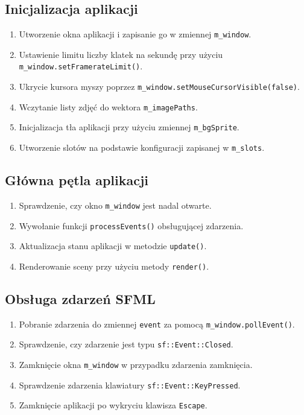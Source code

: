 \documentclass[12pt]{article}
\begin{document}
\subsection{Inicjalizacja aplikacji}
\begin{enumerate}
    \item Utworzenie okna aplikacji i zapisanie go w zmiennej \texttt{m\_window}.
    \item Ustawienie limitu liczby klatek na sekundę przy użyciu \texttt{m\_window.setFramerateLimit()}.
    \item Ukrycie kursora myszy poprzez \texttt{m\_window.setMouseCursorVisible(false)}.
    \item Wczytanie listy zdjęć do wektora \texttt{m\_imagePaths}.
    \item Inicjalizacja tła aplikacji przy użyciu zmiennej \texttt{m\_bgSprite}.
    \item Utworzenie slotów na podstawie konfiguracji zapisanej w \texttt{m\_slots}.
\end{enumerate}

\subsection{Główna pętla aplikacji}
\begin{enumerate}
    \item Sprawdzenie, czy okno \texttt{m\_window} jest nadal otwarte.
    \item Wywołanie funkcji \texttt{processEvents()} obsługującej zdarzenia.
    \item Aktualizacja stanu aplikacji w metodzie \texttt{update()}.
    \item Renderowanie sceny przy użyciu metody \texttt{render()}.
\end{enumerate}

\subsection{Obsługa zdarzeń SFML}
\begin{enumerate}
    \item Pobranie zdarzenia do zmiennej \texttt{event} za pomocą \texttt{m\_window.pollEvent()}.
    \item Sprawdzenie, czy zdarzenie jest typu \texttt{sf::Event::Closed}.
    \item Zamknięcie okna \texttt{m\_window} w przypadku zdarzenia zamknięcia.
    \item Sprawdzenie zdarzenia klawiatury \texttt{sf::Event::KeyPressed}.
    \item Zamknięcie aplikacji po wykryciu klawisza \texttt{Escape}.
\end{enumerate}
\end{document}
